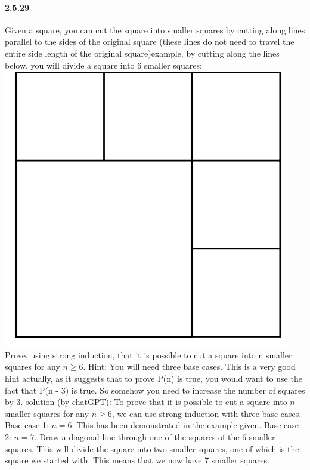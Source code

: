 \documentclass{article}
\begin{document}
\paragraph{2.5.29}
Given a square, you can cut the square into smaller squares by cutting
along lines parallel to the sides of the original square (these lines do
not need to travel the entire side length of the original square)example, by cutting along the lines below, you will divide a square
into 6 smaller squares:\newline
\includegraphics{0009}\newline
Prove, using strong induction, that it is possible to cut a square
into n smaller squares for any $n\ge 6$.\newline
Hint:\newline
You will need three base cases. This is a very good hint actually, as
it suggests that to prove P(n) is true, you would want to use the fact that
P(n - 3) is true. So somehow you need to increase the number of squares
by 3.\newline
solution (by chatGPT):\newline
To prove that it is possible to cut a square into $n$ smaller squares for any $n \ge 6$, we can use strong induction with three base cases.
\newline
Base case 1: $n = 6$. This has been demonstrated in the example given.
\newline
Base case 2: $n = 7$. Draw a diagonal line through one of the squares of the 6 smaller squares. This will divide the square into two smaller squares, one of which is the square we started with. This means that we now have 7 smaller squares.
\end{document}
